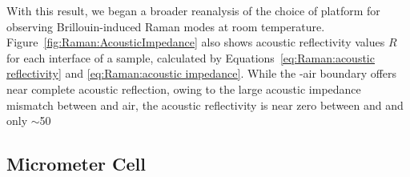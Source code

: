 With this result, we began a broader reanalysis of the choice of platform for observing Brillouin-induced Raman modes at room temperature. Figure~\ref{fig:Raman:AcousticImpedance} also shows acoustic reflectivity values \(R\) for each interface of a  sample, calculated by Equations~\ref{eq:Raman:acoustic reflectivity} and \ref{eq:Raman:acoustic impedance}. While the -air boundary offers near complete acoustic reflection, owing to the large acoustic impedance mismatch between  and air, the acoustic reflectivity is near zero between  and  and only \(\sim\)50%

\subsection{\texorpdfstring{}{CS2} Micrometer Cell}
\label{subsec:Raman:Target:CS2Cells}

